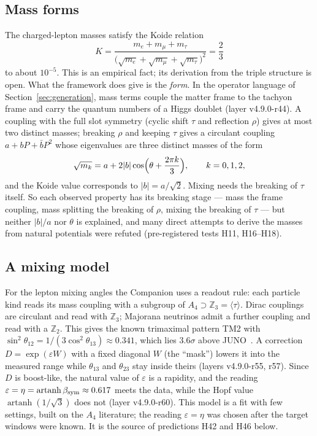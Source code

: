 \subsection{Mass forms}

The charged-lepton masses satisfy the Koide relation~\cite{koide}
\[
K=\frac{m_e+m_\mu+m_\tau}{\bigl(\sqrt{m_e}+\sqrt{m_\mu}+\sqrt{m_\tau}\bigr)^2}=\frac23
\]
to about \(10^{-5}\).  This is an empirical fact; its derivation from the triple structure is open.  What the framework does give is the
\emph{form}.  In the operator language of Section~\ref{sec:generation}, mass terms couple the matter frame to the tachyon frame and carry
the quantum numbers of a Higgs doublet (layer v4.9.0-r44).  A coupling with the full slot symmetry (cyclic shift \(\tau\) and reflection
\(\rho\)) gives at most two distinct masses; breaking \(\rho\) and keeping \(\tau\) gives a circulant coupling \(a+bP+\bar bP^2\) whose
eigenvalues are three distinct masses of the form
\[
\sqrt{m_k}=a+2|b|\cos\Bigl(\theta+\frac{2\pi k}{3}\Bigr),\qquad k=0,1,2,
\]
and the Koide value corresponds to \(|b|=a/\sqrt2\).  Mixing needs the breaking of \(\tau\) itself.  So each observed property has its breaking
stage --- mass the frame coupling, mass splitting the breaking of \(\rho\), mixing the breaking of \(\tau\) --- but neither \(|b|/a\) nor
\(\theta\) is explained, and many direct attempts to derive the masses from natural potentials were refuted (pre-registered tests H11,
H16--H18).

\subsection{A mixing model}

For the lepton mixing angles the Companion uses a readout rule: each particle kind reads its mass coupling with a subgroup of
\(A_4\supset\mathbb Z_3=\langle\tau\rangle\).  Dirac couplings are circulant and read with \(\mathbb Z_3\); Majorana neutrinos admit a further
coupling and read with a \(\mathbb Z_2\).  This gives the known trimaximal pattern TM2 with \(\sin^2\theta_{12}=1/(3\cos^2\theta_{13})\approx0.341\),
which lies \(3.6\sigma\) above JUNO~\cite{juno}.  A correction \(D=\exp(\varepsilon W)\) with a fixed diagonal \(W\) (the ``mask'') lowers it into
the measured range while \(\theta_{13}\) and \(\theta_{23}\) stay inside theirs (layers v4.9.0-r55, r57).  Since \(D\) is boost-like, the
natural value of \(\varepsilon\) is a rapidity, and the reading \(\varepsilon=\eta=\operatorname{artanh}\beta_{\rm sym}\approx0.617\) meets the
data, while the Hopf value \(\operatorname{artanh}(1/\sqrt3)\) does not (layer v4.9.0-r60).  This model is a fit with few settings, built on the
\(A_4\) literature; the reading \(\varepsilon=\eta\) was chosen after the target windows were known.  It is the source of predictions H42 and
H46 below.

